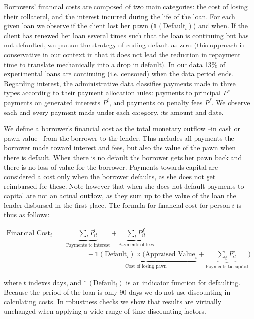 \documentclass[oneside,11pt]{article}
\begin{document}
Borrowers' financial costs are composed of two main categories: the cost of losing their collateral, and the interest incurred during the life of the loan. For each given loan we observe if the client lost her pawn ($\mathds{1}(\text{Default}_i)$) and when. If the client has renewed her loan several times such that the loan is continuing but has not defaulted, we pursue the strategy of coding default as zero (this approach is conservative in our context in that it does not lead the reduction in repayment time to translate mechanically into a drop in default). In our data 13\% of experimental loans are continuing (i.e. censored) when the data period ends. Regarding interest, the administrative data classifies payments made in three types according to their payment allocation rules: payments to principal $P^c$, payments on generated interests $P^i$, and payments on penalty fees $P^f$. We observe each and every payment made under each category, its amount and date. 

We define a borrower's financial cost as the total monetary outflow --in cash or pawn value-- from the borrower to the lender. This includes all payments the borrower made toward interest and fees, but also the value of the pawn when there is default. When there is no default the borrower gets her pawn back and there is no loss of value for the borrower. Payments towards capital are considered a cost only when the borrower defaults, as she does not get reimbursed for these. Note however that when she does not default payments to capital are not an actual outflow, as they sum up to the value of the loan the lender disbursed in the first place. The formula for financial cost for person $i$ is thus as follows:

\begin{align*}
    \text{Financial Cost}_i =&  \underbrace{\sum_t P^i_{it}}_{\text{Payments to interest}} + \underbrace{\sum_t P^f_{it}}_{\text{Payments of fees}}   \\
    &\quad\qquad + \underbrace{\mathds{1}(\text{Default}_i) \times (\text{Appraised Value}_i}_{\text{Cost of losing pawn}} + \underbrace{\sum_t P^c_{it}}_{\text{Payments to capital}})
\end{align*}

\noindent where $t$ indexes days, and $\mathds{1}(\text{Default}_i)$ is an indicator function for defaulting. Because the period of the loan is only 90 days we do not use discounting in calculating costs.  In robustness checks we show that results are virtually unchanged when applying a wide range of time discounting factors.
\end{document}
